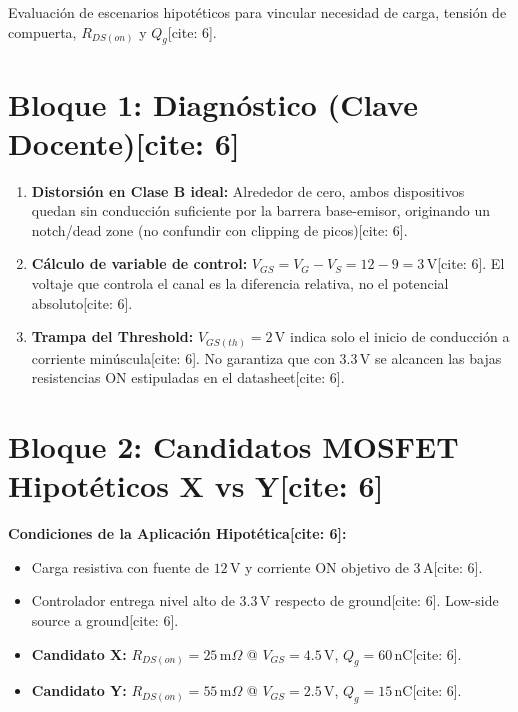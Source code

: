 \documentclass[11pt, a4paper]{article}
\begin{document}
\begin{tcolorbox}[colback=ucbblue!5, colframe=ucbblue, title=\textbf{Hoja de Ejercicios: Selección Preliminar de MOSFET {[cite: 6]}}]
    Evaluación de escenarios hipotéticos para vincular necesidad de carga, tensión de compuerta, $R_{DS(on)}$ y $Q_g$[cite: 6].
\end{tcolorbox}

\section*{Bloque 1: Diagnóstico (Clave Docente)[cite: 6]}
\begin{enumerate}
    \item \textbf{Distorsión en Clase B ideal:} Alrededor de cero, ambos dispositivos quedan sin conducción suficiente por la barrera base-emisor, originando un notch/dead zone (no confundir con clipping de picos)[cite: 6].
    \item \textbf{Cálculo de variable de control:} $V_{GS} = V_G - V_S = 12 - 9 = 3\,\text{V}$[cite: 6]. El voltaje que controla el canal es la diferencia relativa, no el potencial absoluto[cite: 6].
    \item \textbf{Trampa del Threshold:} $V_{GS(th)} = 2\,\text{V}$ indica solo el inicio de conducción a corriente minúscula[cite: 6]. No garantiza que con $3.3\,\text{V}$ se alcancen las bajas resistencias ON estipuladas en el datasheet[cite: 6].
\end{enumerate}

\section*{Bloque 2: Candidatos MOSFET Hipotéticos X vs Y[cite: 6]}
\textbf{Condiciones de la Aplicación Hipotética[cite: 6]:}
\begin{itemize}
    \item Carga resistiva con fuente de $12\,\text{V}$ y corriente ON objetivo de $3\,\text{A}$[cite: 6].
    \item Controlador entrega nivel alto de $3.3\,\text{V}$ respecto de ground[cite: 6]. Low-side source a ground[cite: 6].
    \item \textbf{Candidato X:} $R_{DS(on)} = 25\,\text{m}\Omega$ @ $V_{GS} = 4.5\,\text{V}$, $Q_g = 60\,\text{nC}$[cite: 6].
    \item \textbf{Candidato Y:} $R_{DS(on)} = 55\,\text{m}\Omega$ @ $V_{GS} = 2.5\,\text{V}$, $Q_g = 15\,\text{nC}$[cite: 6].
\end{itemize}
\end{document}
